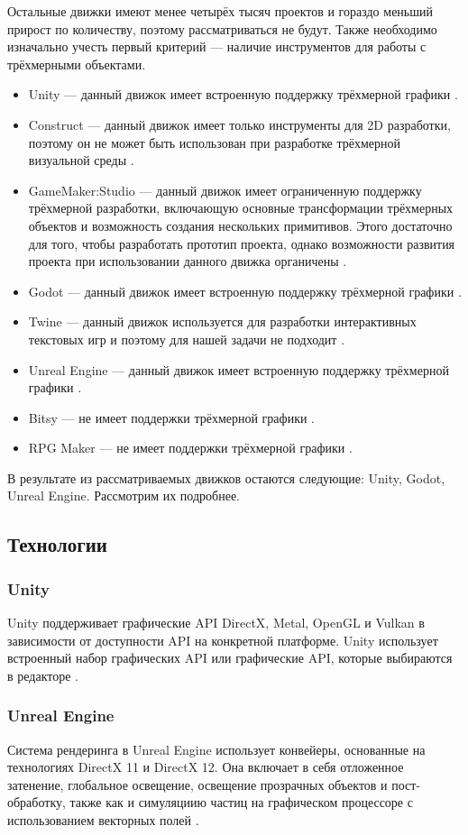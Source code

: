 Остальные движки имеют менее четырёх тысяч проектов и гораздо меньший прирост по количеству, поэтому рассматриваться не будут. Также необходимо изначально учесть первый критерий --- наличие инструментов для работы с трёхмерными объектами.
\begin{itemize}
\item Unity --- данный движок имеет встроенную поддержку трёхмерной графики \cite{unity}.
\item Construct --- данный движок имеет только инструменты для 2D разработки, поэтому он не может быть использован при разработке трёхмерной визуальной среды \cite{construct}.
\item GameMaker:Studio --- данный движок имеет ограниченную поддержку трёхмерной разработки, включающую основные трансформации трёхмерных объектов и возможность создания нескольких примитивов. Этого достаточно для того, чтобы разработать прототип проекта, однако возможности развития проекта при использовании данного движка органичены \cite{gamemaker}.
\item Godot --- данный движок имеет встроенную поддержку трёхмерной графики \cite{godot}.
\item Twine --- данный движок используется для разработки интерактивных текстовых игр и поэтому для нашей задачи не подходит \cite{twine}.
\item Unreal Engine --- данный движок имеет встроенную поддержку трёхмерной графики \cite{unreal}.
\item Bitsy --- не имеет поддержки трёхмерной графики \cite{bisty}.
\item RPG Maker --- не имеет поддержки трёхмерной графики \cite{rpg}.
\end{itemize}

В результате из рассматриваемых движков остаются следующие: Unity, Godot, Unreal Engine. Рассмотрим их подробнее.

\subsection{Технологии}
\subsubsection{Unity}
Unity поддерживает графические API DirectX, Metal, OpenGL и Vulkan в зависимости от доступности API на конкретной платформе. Unity использует встроенный набор графических API или графические API, которые выбираются в редакторе \cite{unity}.
\subsubsection{Unreal Engine}
Система рендеринга в Unreal Engine использует конвейеры, основанные на технологиях DirectX 11 и DirectX 12. Она включает в себя отложенное затенение, глобальное освещение, освещение прозрачных объектов и пост-обработку, также как и симуляциию частиц на графическом процессоре с использованием векторных полей \cite{unreal}.
